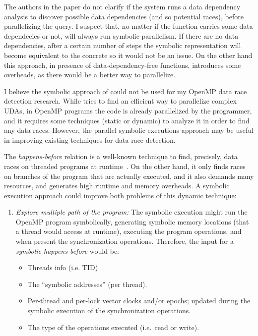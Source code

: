 \begin{refsection}
The authors in the paper do not clarify if the system runs a data dependency
analysis to discover possible data dependencies (and so potential races),
before parallelizing the query.
%
I suspect that, no matter if the function carries some data dependecies or
not, \symp will always run symbolic parallelism.
%
If there are no data dependencies, after a certain number of steps the
symbolic representation will become equivalent to the concrete so it would not
be an issue.
%
On the other hand this approach, in presence of data-dependency-free
functions, introduces some overheads, as there would be a better way to
parallelize.

I believe the symbolic approach of \symp could not be used for my OpenMP data
race detection research.
%
While \symp tries to find an efficient way to parallelize complex UDAs, in
OpenMP programs the code is already parallelized by the programmer, and it
requires some techniques (static or dynamic) to analyze it in order to find
any data races.
%
However, the parallel symbolic executions approach may be useful in improving
existing techniques for data race detection.

The \emph{happens-before} relation is a well-known technique to find,
precisely, data races on threaded programs at runtime~\cite{Flanagan:2009}.
%
On the other hand, it only finds races on branches of the program that are
actually executed, and it also demands many resources, and generates high
runtime and memory overheads.
%
A symbolic execution approach could improve both problems of this dynamic
technique:

\begin{enumerate}
\item \emph{Explore multiple path of the program:} The symbolic execution
  might run the OpenMP program symbolically, generating symbolic memory
  locations (that a thread would access at runtime), executing the program
  operations, and when present the synchronization operations.
  Therefore, the input for a \emph{symbolic happens-before} would be:

  \begin{itemize}
  \item Threads info (i.e. TID)
  \item The ``symbolic addresses'' (per thread).
  \item Per-thread and per-lock vector clocks and/or epochs; updated during
    the symbolic execution of the synchronization operations.
  \item The type of the operations executed (i.e.\ read or write).
  \end{itemize}


\end{enumerate}
\end{refsection}
